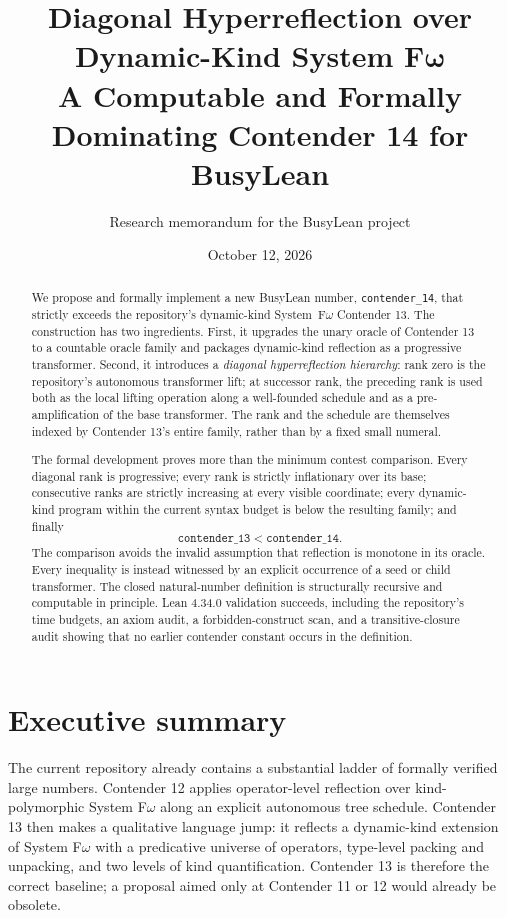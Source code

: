 \documentclass[11pt]{article}
\title{\textbf{Diagonal Hyperreflection over Dynamic-Kind System F$\boldsymbol{\omega}$}\\
A Computable and Formally Dominating Contender 14 for BusyLean}
\author{Research memorandum for the BusyLean project}
\date{October 12, 2026}
\theoremstyle{definition}
\newcommand{\code}[1]{\texttt{#1}}
\begin{document}
\maketitle

\begin{abstract}
We propose and formally implement a new BusyLean number, \code{contender\_14}, that strictly exceeds the repository's dynamic-kind \mbox{System F$\omega$} Contender 13.  The construction has two ingredients.  First, it upgrades the unary oracle of Contender 13 to a countable oracle family and packages dynamic-kind reflection as a progressive transformer.  Second, it introduces a \emph{diagonal hyperreflection hierarchy}: rank zero is the repository's autonomous transformer lift; at successor rank, the preceding rank is used both as the local lifting operation along a well-founded schedule and as a pre-amplification of the base transformer.  The rank and the schedule are themselves indexed by Contender 13's entire family, rather than by a fixed small numeral.

The formal development proves more than the minimum contest comparison.  Every diagonal rank is progressive; every rank is strictly inflationary over its base; consecutive ranks are strictly increasing at every visible coordinate; every dynamic-kind program within the current syntax budget is below the resulting family; and finally
\[
  \texttt{contender\_13} < \texttt{contender\_14}.
\]
The comparison avoids the invalid assumption that reflection is monotone in its oracle.  Every inequality is instead witnessed by an explicit occurrence of a seed or child transformer.  The closed natural-number definition is structurally recursive and computable in principle.  Lean 4.34.0 validation succeeds, including the repository's time budgets, an axiom audit, a forbidden-construct scan, and a transitive-closure audit showing that no earlier contender constant occurs in the definition.
\end{abstract}

\tableofcontents
\newpage

\section{Executive summary}

The current repository already contains a substantial ladder of formally verified large numbers.  Contender 12 applies operator-level reflection over kind-polymorphic System F$\omega$ along an explicit autonomous tree schedule.  Contender 13 then makes a qualitative language jump: it reflects a dynamic-kind extension of System F$\omega$ with a predicative universe of operators, type-level packing and unpacking, and two levels of kind quantification.  Contender 13 is therefore the correct baseline; a proposal aimed only at Contender 11 or 12 would already be obsolete.
\end{document}
